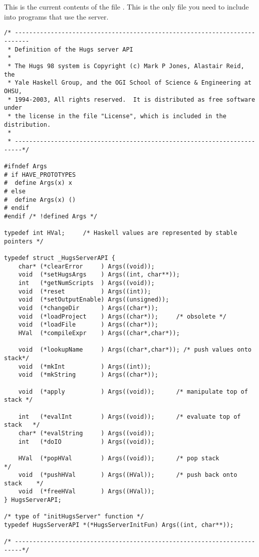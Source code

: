 \appendix

\section{}\label{server.c}

This is the current contents of the file .  This is
the only file you need to include into programs that use the server.

\begin{verbatim}
/* --------------------------------------------------------------------------
 * Definition of the Hugs server API
 *
 * The Hugs 98 system is Copyright (c) Mark P Jones, Alastair Reid, the
 * Yale Haskell Group, and the OGI School of Science & Engineering at OHSU,
 * 1994-2003, All rights reserved.  It is distributed as free software under
 * the license in the file "License", which is included in the distribution.
 *
 * ------------------------------------------------------------------------*/

#ifndef Args
# if HAVE_PROTOTYPES
#  define Args(x) x
# else
#  define Args(x) ()
# endif
#endif /* !defined Args */

typedef int HVal;     /* Haskell values are represented by stable pointers */

typedef struct _HugsServerAPI {
    char* (*clearError     ) Args((void));
    void  (*setHugsArgs    ) Args((int, char**));
    int   (*getNumScripts  ) Args((void));
    void  (*reset          ) Args((int));
    void  (*setOutputEnable) Args((unsigned));
    void  (*changeDir      ) Args((char*));
    void  (*loadProject    ) Args((char*));     /* obsolete */
    void  (*loadFile       ) Args((char*));
    HVal  (*compileExpr    ) Args((char*,char*));

    void  (*lookupName     ) Args((char*,char*)); /* push values onto stack*/
    void  (*mkInt          ) Args((int));
    void  (*mkString       ) Args((char*));

    void  (*apply          ) Args((void));      /* manipulate top of stack */

    int   (*evalInt        ) Args((void));      /* evaluate top of stack   */
    char* (*evalString     ) Args((void));
    int   (*doIO           ) Args((void));

    HVal  (*popHVal        ) Args((void));      /* pop stack               */
    void  (*pushHVal       ) Args((HVal));      /* push back onto stack    */
    void  (*freeHVal       ) Args((HVal)); 
} HugsServerAPI;

/* type of "initHugsServer" function */
typedef HugsServerAPI *(*HugsServerInitFun) Args((int, char**));

/* ------------------------------------------------------------------------*/

\end{verbatim}


